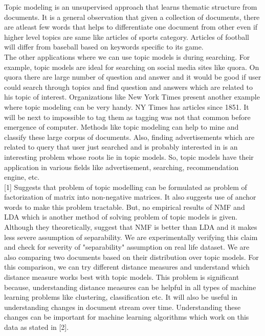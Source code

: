 \documentclass[a4paper,11pt]{article}
\begin{document}
Topic modeling is an unsupervised approach that learns thematic structure from documents. It is a general observation that given a collection of documents, there are atleast few words that helps to differentiate one document from other even if higher level topics are same like articles of sports category. Articles of football will differ from baseball based on keywords specific to its game. \\

The other applications where we can use topic models is during searching. For example, topic models are ideal for searching on social media sites like quora. On quora there are large number of question and answer and it would be good if user could search through topics and find question and answers which are related to his topic of interest. Organizations like New York Times present another example where topic modeling can be very handy. NY Times has articles since 1851. It will be next to impossible to tag them as tagging was not that common before emergence of computer. Methods like topic modeling can help to mine and classify these large corpus of documents. Also, finding advertisements which are related to query that user just searched and is probably interested in is an interesting problem whose roots lie in topic models. So, topic models have their application in various fields like advertisement, searching, recommendation engine, etc. \\

[1] Suggests that problem of topic modelling can be formulated as problem of factorization of matrix into non-negative matrices. It also suggests use of anchor words to make this problem tractable. But, no empirical results of NMF and LDA which is another method of solving problem of topic models is given. Although they theoretically, suggest that NMF is better than LDA and it makes less severe assumption of separability. We are experimentally verifying this claim and check for severity of "separability" assumption on real life dataset. We are also comparing two documents based on their distribution over topic models. For this comparison, we can try different distance measures and understand which distance measure works best with topic models. This problem is significant because, understanding distance measures can be helpful in all types of machine learning problems like clustering, classification etc. It will also be useful in understanding changes in document stream over time. Understanding these changes can be important for machine learning algorithms which work on this data as stated in [2]. \\
\end{document}
